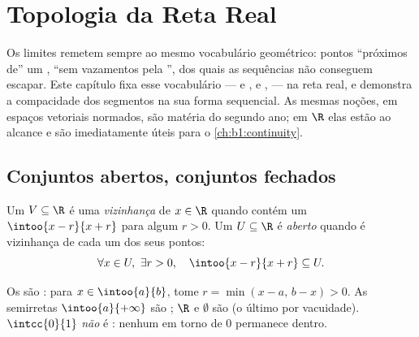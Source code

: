 \chapter{Topologia da Reta Real}\label{ch:b1:topology}

Os limites remetem sempre ao mesmo vocabulário geométrico: pontos
``próximos de'' um ,  ``sem vazamentos pela
'',  dos quais as sequências não conseguem escapar.
Este capítulo fixa esse vocabulário ---  e ,
 e ,  --- na reta real, e demonstra a compacidade
dos segmentos na sua forma sequencial. As mesmas noções, em espaços
vetoriais normados, são matéria do segundo ano; em $\R$ elas estão ao
alcance e são imediatamente úteis para o \cref{ch:b1:continuity}.

\section{Conjuntos abertos, conjuntos fechados}

\begin{definition}\label{def:b1:topology:open}
Um  $V \subseteq \R$ é uma \emph{vizinhança}
de $x \in \R$ quando contém um  $\intoo{x - r}{x + r}$ para
algum $r > 0$. Um  $U \subseteq \R$ é \emph{aberto}
quando é vizinhança de cada um dos seus pontos:
\[
\forall x \in U,\ \exists r > 0, \quad \intoo{x - r}{x + r}
\subseteq U .
\]
\end{definition}

\begin{example}\label{ex:b1:topology:open}
Os   são : para $x \in \intoo{a}{b}$, tome $r = \min(x -
a,\, b - x) > 0$. As semirretas $\intoo{a}{+\infty}$ são ; $\R$ e
$\emptyset$ são  (o último por vacuidade). $\intcc{0}{1}$ \emph{não}
é : nenhum  em torno de $0$ permanece dentro.
\end{example}

